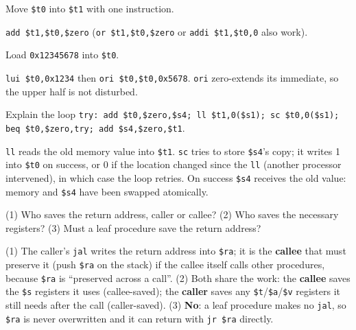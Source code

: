 \begin{exercise}
Move \texttt{\$t0} into \texttt{\$t1} with one instruction.
\end{exercise}
\begin{solution}
\texttt{add \$t1,\$t0,\$zero} (\texttt{or \$t1,\$t0,\$zero} or
\texttt{addi \$t1,\$t0,0} also work).
\end{solution}

\begin{exercise}
Load \texttt{0x12345678} into \texttt{\$t0}.
\end{exercise}
\begin{solution}
\texttt{lui \$t0,0x1234} then \texttt{ori \$t0,\$t0,0x5678}. \texttt{ori}
zero-extends its immediate, so the upper half is not disturbed.
\end{solution}

\begin{exercise}
Explain the loop
\texttt{try: add \$t0,\$zero,\$s4; ll \$t1,0(\$s1); sc \$t0,0(\$s1);
beq \$t0,\$zero,try; add \$s4,\$zero,\$t1}.
\end{exercise}
\begin{solution}
\texttt{ll} reads the old memory value into \texttt{\$t1}. \texttt{sc}
tries to store \texttt{\$s4}'s copy; it writes 1 into \texttt{\$t0} on
success, or 0 if the location changed since the \texttt{ll} (another
processor intervened), in which case the loop retries. On success
\texttt{\$s4} receives the old value: memory and \texttt{\$s4} have been
swapped atomically.
\end{solution}

\begin{exercise}
(1) Who saves the return address, caller or callee? (2) Who saves the
necessary registers? (3) Must a leaf procedure save the return address?
\end{exercise}
\begin{solution}
(1) The caller's \texttt{jal} writes the return address into \texttt{\$ra};
it is the \textbf{callee} that must preserve it (push \texttt{\$ra} on the
stack) if the callee itself calls other procedures, because \texttt{\$ra} is
``preserved across a call''. (2) Both share the work: the \textbf{callee}
saves the \texttt{\$s} registers it uses (callee-saved); the \textbf{caller}
saves any \texttt{\$t}/\texttt{\$a}/\texttt{\$v} registers it still needs
after the call (caller-saved). (3) \textbf{No}: a leaf procedure makes no
\texttt{jal}, so \texttt{\$ra} is never overwritten and it can return with
\texttt{jr \$ra} directly.
\end{solution}

